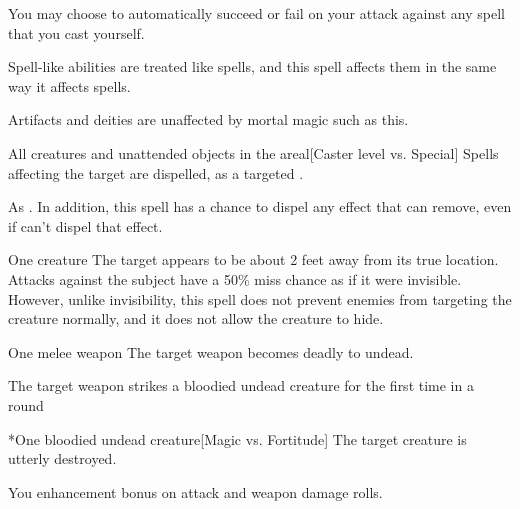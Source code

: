 You may choose to automatically succeed or fail on your attack against any spell that you cast yourself.

Spell-like abilities are treated like spells, and this spell affects them in the same way it affects spells.

Artifacts and deities are unaffected by mortal magic such as this.

\begin{spelltargets}{All creatures and unattended objects in the area}l[Caster level vs. Special]
    \spelleffect Spells affecting the target are dispelled, as a targeted .
\end{spelltargets}
\spellnotes As . In addition, this spell has a chance to dispel any effect that  can remove, even if  can't dispel that effect.

\spellrng{\rngclose}
\spelldur{\durshort \dismissable}
\begin{spelltarget}{One creature}
    \spelleffect The target appears to be about 2 feet away from its true location. Attacks against the subject have a 50\% miss chance as if it were invisible. However, unlike invisibility, this spell does not prevent enemies from targeting the creature normally, and it does not allow the creature to hide.
\end{spelltarget}

\spellrng{\rngclose}
\spelldur{\durshort}
\begin{spelltarget}{One melee weapon}
    \spelleffect The target weapon becomes deadly to undead.
    \begin{spelltrigger}{The target weapon strikes a bloodied undead creature for the first time in a round}
        \begin{spelltarget}*{One bloodied undead creature}[Magic vs. Fortitude]
            \spellsuccess The target creature is utterly destroyed.
        \end{spelltarget}
    \end{spelltrigger}
\end{spelltarget}

\spelldur{\durshort}
\begin{spelltarget}{You}
    \spelleffect {} enhancement bonus on attack and weapon damage rolls. \spellbonusscalingdescription
\end{spelltarget}

